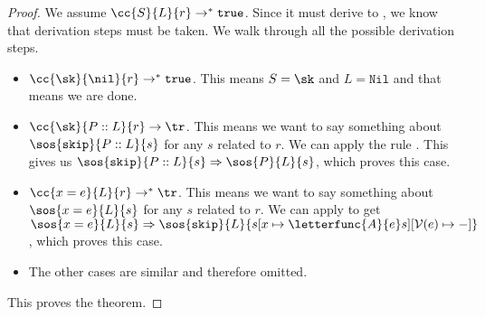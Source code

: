 \begin{proof}
We assume $\cc{S}{L}{r} \to ^* \texttt{true}$. Since it must derive to \tr, we know that derivation steps must be taken. We walk through all the possible derivation steps. 
\begin{itemize}[noitemsep]
    \item $\cc{\sk}{\nil}{r} \to ^* \texttt{true}$. This means $S = \sk$ and $L = \texttt{Nil}$ and that means we are done.
    \item $\cc{\sk} {P::L}{ r} \to \tr$. This means we want to say something about $\sos{\texttt{skip}}{P::L}{s}$ for any $s$ related to $r$. We can apply the rule \loadsos. This gives us $\sos{\texttt{skip}}{P::L}{s} \Rightarrow \sos{P}{L}{s}$, which proves this case. 
    \item $\cc{x=e}{L}{r} \to ^{*} \tr$. This means we want to say something about $\sos{x=e}{L}{s}$ for any $s$ related to $r$. We can apply \asssos to get $\sos{x=e}{L}{s} \Rightarrow \sos{\texttt{skip}}{L}{s[x \mapsto \letterfunc{A}{e}s][\mathcal{V}(e)\mapsto-]}$, which proves this case. 
     \item The other cases are similar and therefore omitted. 
\end{itemize}
This proves the theorem.
\end{proof}

 



